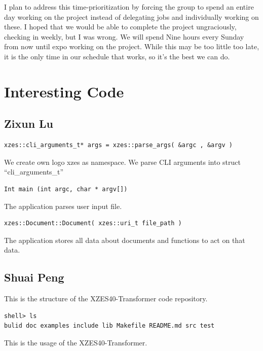 I plan to address this time-prioritization by forcing the group to spend an entire day working on the project instead of delegating jobs and individually working on these.
I hoped that we would be able to complete the project ungraciously, checking in weekly, but I was wrong.
We will spend Nine hours every Sunday from now until expo working on the project.
While this may be too little too late, it is the only time in our schedule that works, so it's the best we can do.

\section{Interesting Code}

\subsection{Zixun Lu}

\begin{lstlisting}
xzes::cli_arguments_t* args = xzes::parse_args( &argc , &argv )
\end{lstlisting}

We create own logo xzes as namespace. We parse CLI arguments into struct ``cli\_arguments\_t''

\begin{lstlisting}
Int main (int argc, char * argv[])
\end{lstlisting}
The application parses user input file. 

\begin{lstlisting}
xzes::Document::Document( xzes::uri_t file_path )
\end{lstlisting}
The application stores all data about documents and functions to act on that data. 

\subsection{Shuai Peng}

This is the structure of the XZES40-Transformer code repository.

\begin{lstlisting}
shell> ls
bulid doc examples include lib Makefile README.md src test
\end{lstlisting}

This is the usage of the XZES40-Transformer.

